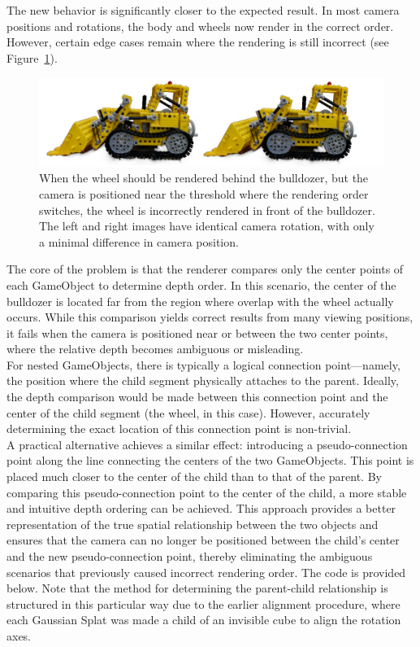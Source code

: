 \documentclass[12pt]{article}
\begin{document}
The new behavior is significantly closer to the expected result. In most camera positions and rotations, the body and wheels now render in the correct order. However, certain edge cases remain where the rendering is still incorrect (see Figure~\ref{fig:wheel_almost}).
\begin{figure}[h!]
	\centering
	\includegraphics[width=\textwidth]{Images/wheel_almost.png}
	\caption{When the wheel should be rendered behind the bulldozer, but the camera is positioned near the threshold where the rendering order switches, the wheel is incorrectly rendered in front of the bulldozer. The left and right images have identical camera rotation, with only a minimal difference in camera position.}
	\label{fig:wheel_almost}
\end{figure}
\FloatBarrier
\noindent
The core of the problem is that the renderer compares only the center points of each GameObject to determine depth order. In this scenario, the center of the bulldozer is located far from the region where overlap with the wheel actually occurs. While this comparison yields correct results from many viewing positions, it fails when the camera is positioned near or between the two center points, where the relative depth becomes ambiguous or misleading.\\
For nested GameObjects, there is typically a logical connection point—namely, the position where the child segment physically attaches to the parent. Ideally, the depth comparison would be made between this connection point and the center of the child segment (the wheel, in this case). However, accurately determining the exact location of this connection point is non-trivial.\\
A practical alternative achieves a similar effect: introducing a pseudo-connection point along the line connecting the centers of the two GameObjects. This point is placed much closer to the center of the child than to that of the parent. By comparing this pseudo-connection point to the center of the child, a more stable and intuitive depth ordering can be achieved. This approach provides a better representation of the true spatial relationship between the two objects and ensures that the camera can no longer be positioned between the child’s center and the new pseudo-connection point, thereby eliminating the ambiguous scenarios that previously caused incorrect rendering order. The code is provided below. Note that the method for determining the parent-child relationship is structured in this particular way due to the earlier alignment procedure, where each Gaussian Splat was made a child of an invisible cube to align the rotation axes.
\end{document}
